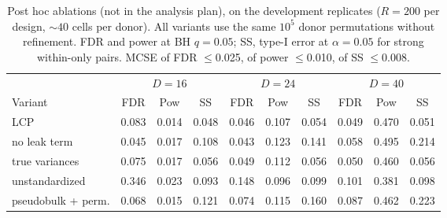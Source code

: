\begin{table}[h]\centering\footnotesize\setlength{\tabcolsep}{3pt}
\caption{Post hoc ablations (not in the analysis plan), on the development replicates ($R=200$ per design, ${\sim}40$ cells per donor). All variants use the same $10^5$ donor permutations without refinement. FDR and power at BH $q=0.05$; SS, type-I error at $\alpha=0.05$ for strong within-only pairs. MCSE of FDR $\le$0.025, of power $\le$0.010, of SS $\le$0.008.}\label{tab:ablate}
\begin{tabular}{lccccccccc}
\toprule
& \multicolumn{3}{c}{$D=16$} & \multicolumn{3}{c}{$D=24$} & \multicolumn{3}{c}{$D=40$} \\
Variant & FDR & Pow & SS & FDR & Pow & SS & FDR & Pow & SS \\
\midrule
LCP & 0.083 & 0.014 & 0.048 & 0.046 & 0.107 & 0.054 & 0.049 & 0.470 & 0.051 \\
no leak term & 0.045 & 0.017 & 0.108 & 0.043 & 0.123 & 0.141 & 0.058 & 0.495 & 0.214 \\
true variances & 0.075 & 0.017 & 0.056 & 0.049 & 0.112 & 0.056 & 0.050 & 0.460 & 0.056 \\
unstandardized & 0.346 & 0.023 & 0.093 & 0.148 & 0.096 & 0.099 & 0.101 & 0.381 & 0.098 \\
pseudobulk + perm. & 0.068 & 0.015 & 0.121 & 0.074 & 0.115 & 0.160 & 0.087 & 0.462 & 0.223 \\
\bottomrule
\end{tabular}
\end{table}
